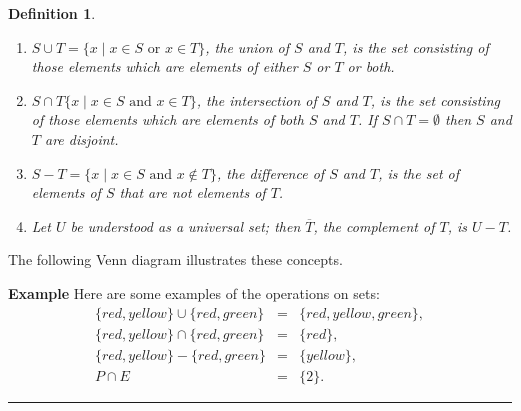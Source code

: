\documentclass[12pt,a4paper]{article}
\newtheorem{definition}[theorem]{Definition}
\newcommand*{\qed}{\hfill\rule[-2pt]{4pt}{10pt}}
\newenvironment{example}{\textbf{Example}}{}
\begin{document}
\begin{definition}\mbox{}
\begin{enumerate}
\item $S\cup T=\{x\mid x\in S \textrm{\ or \ } x\in T\}$, the \emph{union} of
$S$ and $T$, is the set consisting of those elements which are elements
of \emph{either} $S$ \emph{or} $T$ or both.

\item $S\cap T\{x\mid x\in S \textrm{\ and \ } x\in T\}$, the \emph{intersection} of $S$ and $T$, is the set consisting of those elements which are elements of \emph{both} $S$ \emph{and} $T$. If $S\cap T=\emptyset$ then $S$ and $T$ are \emph{disjoint}.

\item $S-T=\{x\mid x\in S \textrm{\ and \ } x\not\in T\}$, the \emph{difference} of $S$ and $T$, is the set of elements of $S$ that are not elements of $T$.

\item Let $U$ be understood as a universal set; then $\overline{T}$, the
\emph{complement} of $T$, is $U-T$.
\end{enumerate}
\end{definition}

The following Venn diagram illustrates these concepts.

\begin{center}
\end{center}

\begin{example} Here are some examples of the operations on sets:
\begin{displaymath}
\begin{array}{lll}
\{\mathit{red}, \mathit{yellow}\} \cup \{\mathit{red}, \mathit{green}\} &=& \{\mathit{red}, \mathit{yellow}, \mathit{green}\}, \\
\{\mathit{red}, \mathit{yellow}\} \cap \{\mathit{red}, \mathit{green}\} &=& \{\mathit{red}\}, \\
\{\mathit{red}, \mathit{yellow}\} - \{\mathit{red}, \mathit{green}\} &=& \{\mathit{yellow}\}, \\
P \cap E &=& \{2\}.
\end{array}
\end{displaymath}\qed
\end{example}
\end{document}
